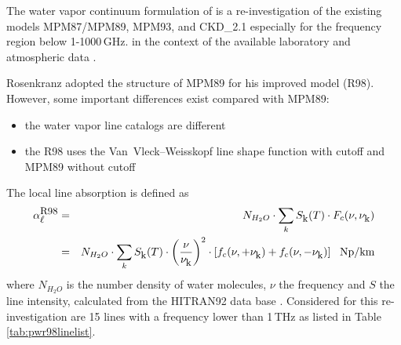 \label{leveld:pwr98_h2o}
The water vapor continuum formulation of \citet{pwr:98} is a re-investigation 
of the existing models MPM87/MPM89, MPM93, and CKD\_2.1 especially for 
the frequency region below 1-1000\,GHz. in the context of the available
laboratory and atmospheric data \citep{abaueretal:89, abaueretal:93, 
abaueretal:95, beckerautler:46, englishetal:94, godonetal:92,
liebe:84, liebeandlayton:87, westwateretal:90}.

Rosenkranz adopted the structure of MPM89 for his improved model (R98). 
However, some important differences exist compared with MPM89:
\begin{itemize}
\item the water vapor line catalogs are different 
\item the R98 uses the Van~Vleck--Weisskopf line shape function with 
      cutoff and MPM89 without cutoff
\end{itemize}


\label{levele:pwr98_h2oline}
The local line absorption is defined as 
\begin{eqnarray} 
 \label{eq:pwr98absline}
 \alpha^{\mbox{\rm \small R98}}_{\mbox{\small $\ell$}} &=& N_{H_2O} \cdot \sum_k S_{\mbox{\rm \small k}}(T) \cdot F_{c}(\nu,\nu_{\mbox{\rm \small k}}) \nonumber\\
            &=& N_{H_2O} \cdot \sum_k S_{\mbox{\rm \small k}}(T) \cdot 
                \left (\displaystyle{\frac{\nu}{\nu_{\mbox{\rm \small k}}}}\right )^2  \cdot 
                \left [f_{c}(\nu,+\nu_{\mbox{\rm \small k}}) + f_{c}(\nu,-\nu_{\mbox{\rm \small k}}) \right]~~\mbox{Np/km}
\end{eqnarray}
where $N_{H_2O}$ is the number density of water molecules, $\nu$ the
frequency and $S$ the line intensity, calculated from the HITRAN92
data base \citet{rothman:92}. Considered for this re-investigation are 
15 lines with a frequency lower than 1\,THz as listed in 
Table \ref{tab:pwr98linelist}.


